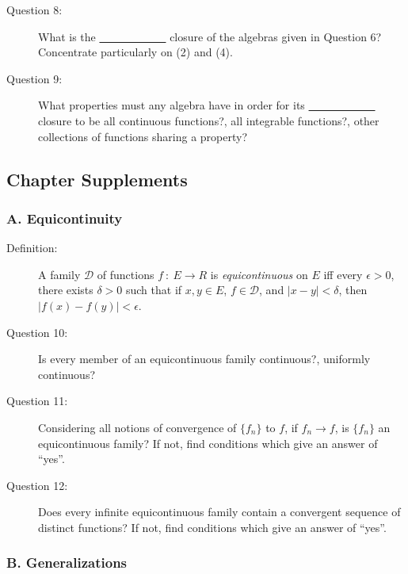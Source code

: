 \documentclass{article}
\begin{document}
\begin{description}
  \item[Question 8:] What is the \underline{\ \ \ \ \ \ \ \ \ \ \ \ } closure of the algebras given in Question 6? Concentrate particularly on (2) and (4).

  \item[Question 9:] What properties must any algebra have in order for its \underline{\ \ \ \ \ \ \ \ \ \ \ \ } closure to be all continuous functions?, all integrable functions?, other collections of functions sharing a property?

\end{description}


\subsection*{Chapter Supplements}


\subsubsection*{A. Equicontinuity}

\begin{description}

  \item[Definition:] A family $\mathcal{D}$ of functions $f\ :\ E \to R$ is \emph{equicontinuous} on $E$ iff every $\epsilon > 0$, there exists $\delta > 0$ such that if $x,y \in E$, $f \in \mathcal{D}$, and $|x-y| < \delta$, then $|f(x)-f(y)| < \epsilon$.

  \item[Question 10:] Is every member of an equicontinuous family continuous?, uniformly continuous?

  \item[Question 11:] Considering all notions of convergence of $\{ f_n \}$ to $f$, if $f_n \to f$, is $\{ f_n \}$ an equicontinuous family? If not, find conditions which give an answer of ``yes''.

  \item[Question 12:] Does every infinite equicontinuous family contain a convergent sequence of distinct functions? If not, find conditions which give an answer of ``yes''.

\end{description}


\subsubsection*{B. Generalizations}
\end{document}
